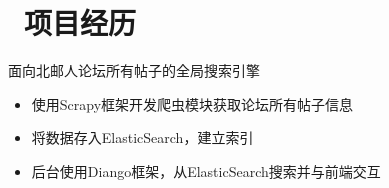 \documentclass{resume}
\begin{document}
\section{\faUsers\ 项目经历}



\begin{onehalfspacing}
面向北邮人论坛所有帖子的全局搜索引擎
\begin{itemize}
  \item 使用Scrapy框架开发爬虫模块获取论坛所有帖子信息
  \item 将数据存入ElasticSearch，建立索引
  \item 后台使用Diango框架，从ElasticSearch搜索并与前端交互
\end{itemize}
\end{onehalfspacing}
\end{document}
